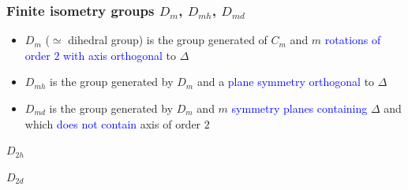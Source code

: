 \documentclass{beamer}
\begin{document}
\begin{frame}\frametitle{Finite isometry groups $D_m$, $D_{mh}$, $D_{md}$}

\begin{itemize}
\item $D_m$ ($\simeq$ dihedral group) is the group generated of $C_m$ and 
$m$ \textcolor{blue}{rotations of order $2$
with axis orthogonal} to $\Delta$
\item $D_{mh}$ is the group generated by $D_m$ and a 
\textcolor{blue}{plane symmetry orthogonal} to
$\Delta$
\item $D_{md}$ is the group generated by $D_m$ and $m$ 
\textcolor{blue}{symmetry planes containing}
$\Delta$ and which \textcolor{blue}{does not contain} axis of order $2$
\end{itemize}

\begin{center}
\begin{minipage}{3.9cm}
\centering
{}\par
$D_{2h}$
\end{minipage}
\begin{minipage}{3cm}
\centering
{}\par
$D_{2d}$
\end{minipage}
\end{center}    


\end{frame}
\end{document}
